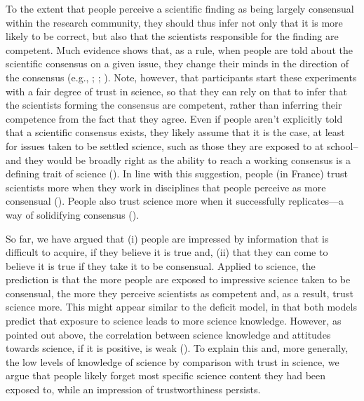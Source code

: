 \documentclass[
  man,
  floatsintext,
  longtable,
  nolmodern,
  notxfonts,
  notimes,
  colorlinks=true,linkcolor=blue,citecolor=blue,urlcolor=blue]{apa7}
\begin{document}
To the extent that people perceive a scientific finding as being largely
consensual within the research community, they should thus infer not
only that it is more likely to be correct, but also that the scientists
responsible for the finding are competent. Much evidence shows that, as
a rule, when people are told about the scientific consensus on a given
issue, they change their minds in the direction of the consensus (e.g.,
;
;
). Note, however, that participants start these experiments with a
fair degree of trust in science, so that they can rely on that to infer
that the scientists forming the consensus are competent, rather than
inferring their competence from the fact that they agree. Even if people
aren't explicitly told that a scientific consensus exists, they likely
assume that it is the case, at least for issues taken to be settled
science, such as those they are exposed to at school--and they would be
broadly right as the ability to reach a working consensus is a defining
trait of science
().
In line with this suggestion, people (in France) trust scientists more
when they work in disciplines that people perceive as more consensual
().
People also trust science more when it successfully replicates---a way
of solidifying consensus
().

So far, we have argued that (i) people are impressed by information that
is difficult to acquire, if they believe it is true and, (ii) that they
can come to believe it is true if they take it to be consensual. Applied
to science, the prediction is that the more people are exposed to
impressive science taken to be consensual, the more they perceive
scientists as competent and, as a result, trust science more. This might
appear similar to the deficit model, in that both models predict that
exposure to science leads to more science knowledge. However, as pointed
out above, the correlation between science knowledge and attitudes
towards science, if it is positive, is weak
().
To explain this and, more generally, the low levels of knowledge of
science by comparison with trust in science, we argue that people likely
forget most specific science content they had been exposed to, while an
impression of trustworthiness persists.
\end{document}
